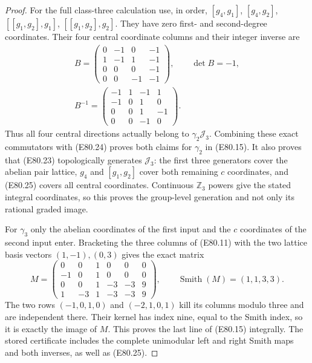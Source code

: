 \begin{proof}
For the full class-three calculation use, in order,
$[g_4,g_1]$, $[g_4,g_2]$,
$[[g_1,g_2],g_1]$, $[[g_1,g_2],g_2]$.
They have zero first- and second-degree coordinates.
Their four central coordinate columns and their
integer inverse are
\[
 \begin{gathered}
 B=\begin{pmatrix}
 0&-1&0&-1\\1&-1&1&-1\\0&0&0&-1\\0&0&-1&-1
 \end{pmatrix},\qquad\det B=-1,\\
 B^{-1}=\begin{pmatrix}
 -1&1&-1&1\\-1&0&1&0\\0&0&1&-1\\0&0&-1&0
 \end{pmatrix}.
 \end{gathered}
 \tag{E80.25}
\]
Thus all four central directions actually belong
to $\gamma_2\mathcal J_3$. Combining these exact
commutators with (E80.24) proves both claims for
$\gamma_2$ in (E80.15). It also proves that
(E80.23) topologically generates $\mathcal J_3$:
the first three generators cover the abelian
pair lattice, $g_4$ and $[g_1,g_2]$ cover both
remaining $c$ coordinates, and (E80.25) covers
all central coordinates. Continuous
$\mathbb Z_3$ powers give the stated integral
coordinates, so this proves the group-level
generation and not only its rational graded image.

For $\gamma_3$ only the abelian coordinates of
the first input and the $c$ coordinates of the
second input enter. Bracketing the three columns
of (E80.11) with the two lattice basis vectors
$(1,-1),(0,3)$ gives the exact matrix
\[
 M=\begin{pmatrix}
 0&0&1&0&0&0\\
 -1&0&1&0&0&0\\
 0&0&1&-3&-3&9\\
 1&-3&1&-3&-3&9
 \end{pmatrix},\qquad
       \operatorname{Smith}(M)=(1,1,3,3).
 \tag{E80.26}
\]
The two rows
$(-1,0,1,0)$ and $(-2,1,0,1)$ kill its columns
modulo three and are independent there. Their
kernel has index nine, equal to the Smith index,
so it is exactly the image of $M$. This proves
the last line of (E80.15) integrally.
The stored certificate includes the complete
unimodular left and right Smith maps and both
inverses, as well as (E80.25).


\end{proof}
